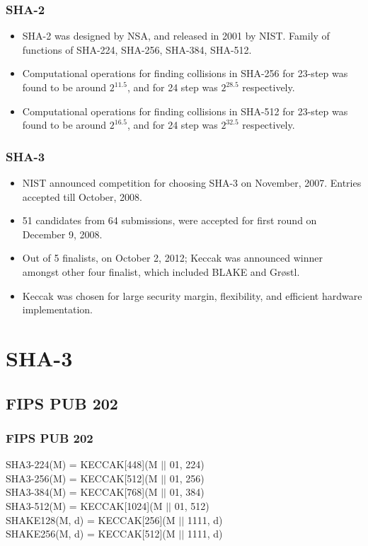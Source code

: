 \documentclass{beamer}
\begin{document}
\begin{frame}
\frametitle{SHA-2}
\begin{itemize}
\item SHA-2 was designed by NSA, and released in 2001 by NIST. Family of functions of SHA-224, SHA-256, 
SHA-384, SHA-512.
\item Computational operations for finding collisions in SHA-256 for 23-step was found to be around 
$2^{11.5}$, and for 24 step was $2^{28.5}$ respectively.
\item Computational operations for finding collisions in SHA-512 for 23-step was found to be around 
$2^{16.5}$, and for 24 step was $2^{32.5}$ respectively\footnotemark.
\end{itemize}
\end{frame}

\begin{frame}
\frametitle{SHA-3}
\begin{itemize}
\item NIST announced competition for choosing SHA-3 on November, 2007. Entries accepted till October, 2008.
\item 51 candidates from 64 submissions, were accepted for first round on December 9, 2008.
\item Out of 5 finalists, on October 2, 2012; Keccak was announced winner amongst other four finalist, which
included BLAKE and Gr{\o}stl.
\item Keccak was chosen for large security margin, flexibility, and efficient hardware implementation.
\end{itemize}
\end{frame}

\section{SHA-3}

\subsection{FIPS PUB 202}

\begin{frame}
\frametitle{FIPS PUB 202\footnotemark}
SHA3-224(M) = KECCAK[448](M $\vert \vert$ 01, 224) \\
SHA3-256(M) = KECCAK[512](M $\vert \vert$ 01, 256) \\
SHA3-384(M) = KECCAK[768](M $\vert \vert$ 01, 384) \\
SHA3-512(M) = KECCAK[1024](M $\vert \vert$ 01, 512) \\
SHAKE128(M, d) = KECCAK[256](M $\vert \vert$ 1111, d) \\
SHAKE256(M, d) = KECCAK[512](M $\vert \vert$ 1111, d)
\end{frame}
\end{document}
